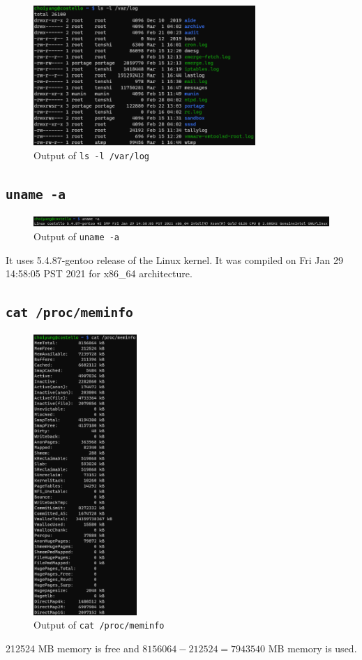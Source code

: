 \documentclass{article}
\begin{document}
\begin{figure}[H]
  \caption{Output of \texttt{ls -l /var/log}}
  \centering
  \includegraphics[width=0.75\textwidth]{ECE4310_proj1_part1_1c.png}
\end{figure}

\subsection{\texttt{uname -a}}

\begin{figure}[H]
  \caption{Output of \texttt{uname -a}}
  \centering
  \includegraphics[width=\textwidth]{ECE4310_proj1_part1_2.png}
\end{figure}
It uses 5.4.87-gentoo release of the Linux kernel. It was compiled on Fri Jan 29 14:58:05 PST 2021 for x86\_64 architecture.

\subsection{\texttt{cat /proc/meminfo}}
\begin{figure}[H]
  \caption{Output of \texttt{cat /proc/meminfo}}
  \centering
  \includegraphics[width=0.35\textwidth]{ECE4310_proj1_part1_3.png}
\end{figure}
212524 MB memory is free and $8156064-212524=7943540$ MB memory is used.
\newpage
\end{document}

